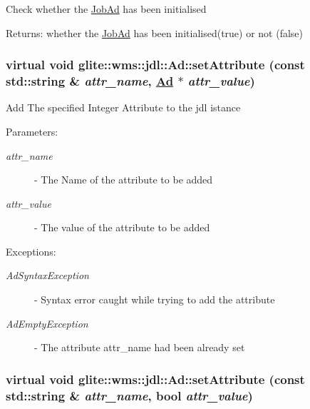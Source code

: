 Check whether the \hyperlink{classglite_1_1wms_1_1jdl_1_1JobAd}{Job\-Ad} has been initialised \begin{Desc}
\item[Returns:]whether the \hyperlink{classglite_1_1wms_1_1jdl_1_1JobAd}{Job\-Ad} has been initialised(true) or not (false) \end{Desc}
\hypertarget{classglite_1_1wms_1_1jdl_1_1Ad_z19_14}{
\subsubsection[setAttribute]{\setlength{\rightskip}{0pt plus 5cm}virtual void glite::wms::jdl::Ad::set\-Attribute (const std::string \& {\em attr\_\-name}, \hyperlink{classglite_1_1wms_1_1jdl_1_1Ad}{Ad} $\ast$ {\em attr\_\-value})}}
\label{classglite_1_1wms_1_1jdl_1_1Ad_z19_14}


Add The specified Integer Attribute to the jdl istance \begin{Desc}
\item[Parameters:]
\begin{description}
\item[{\em attr\_\-name}]- The Name of the attribute to be added \item[{\em attr\_\-value}]- The value of the attribute to be added \end{description}
\end{Desc}
\begin{Desc}
\item[Exceptions:]
\begin{description}
\item[{\em Ad\-Syntax\-Exception}]- Syntax error caught while trying to add the attribute \item[{\em Ad\-Empty\-Exception}]- The attribute attr\_\-name had been already set \end{description}
\end{Desc}
\hypertarget{classglite_1_1wms_1_1jdl_1_1Ad_z19_13}{
\subsubsection[setAttribute]{\setlength{\rightskip}{0pt plus 5cm}virtual void glite::wms::jdl::Ad::set\-Attribute (const std::string \& {\em attr\_\-name}, bool {\em attr\_\-value})}}
\label{classglite_1_1wms_1_1jdl_1_1Ad_z19_13}


